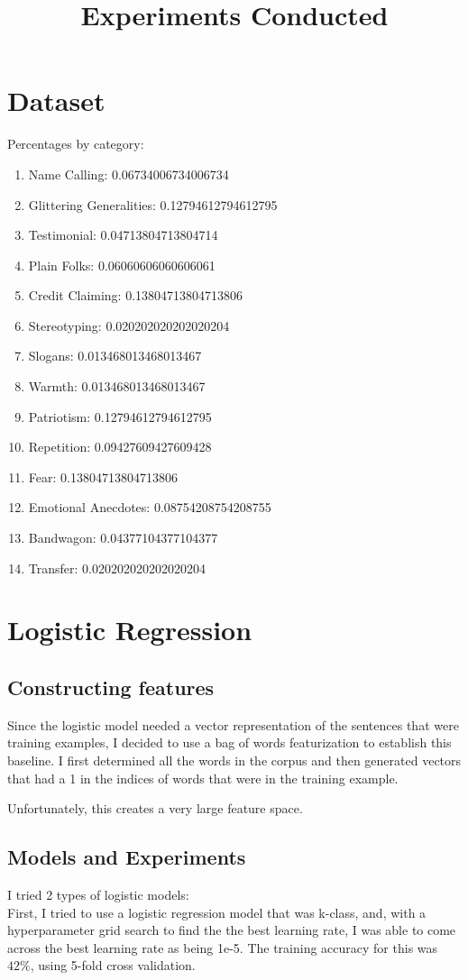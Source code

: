 \documentclass[letterpaper]{article}
\title{Experiments Conducted}
\begin{document}
\section*{Dataset}
Percentages by category: \\
\begin{enumerate}[1.]
\item Name Calling: 0.06734006734006734
\item Glittering Generalities: 0.12794612794612795
\item Testimonial: 0.04713804713804714
\item Plain Folks: 0.06060606060606061
\item Credit Claiming: 0.13804713804713806
\item Stereotyping: 0.020202020202020204
\item Slogans: 0.013468013468013467
\item Warmth: 0.013468013468013467
\item Patriotism: 0.12794612794612795
\item Repetition: 0.09427609427609428
\item Fear: 0.13804713804713806
\item Emotional Anecdotes: 0.08754208754208755
\item Bandwagon: 0.04377104377104377
\item Transfer: 0.020202020202020204
\end{enumerate}
\section*{Logistic Regression}
\subsection*{Constructing features}
Since the logistic model needed a vector representation of the sentences that were training examples, I decided to use a bag of words featurization to establish this baseline. I first determined all the words in the corpus and then generated vectors that had a 1 in the indices of words that were in the training example.

Unfortunately, this creates a very large feature space.
\subsection*{Models and Experiments}
I tried 2 types of logistic models: \\
First, I tried to use a logistic regression model that was k-class, and, with a hyperparameter grid search to find the the best learning rate, I was able to come across the best learning rate as being 1e-5. The training accuracy for this was $42\%$, using 5-fold cross validation. 
\end{document}

